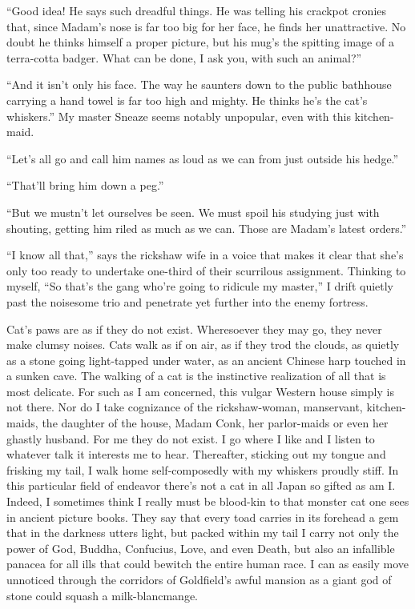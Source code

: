 \documentclass[12pt, openright]{book}
\begin{document}
``Good idea! He says such dreadful things. He was telling his crackpot
cronies that, since Madam's nose is far too big for her face, he finds
her unattractive. No doubt he thinks himself a proper picture, but his
mug's the spitting image of a terra-cotta badger. What can be done, I
ask you, with such an animal?''

``And it isn't only his face. The way he saunters down to the public
bathhouse carrying a hand towel is far too high and mighty. He thinks
he's the cat's whiskers.'' My master Sneaze seems notably unpopular,
even with this kitchen-maid.

``Let's all go and call him names as loud as we can from just outside
his hedge.''

``That'll bring him down a peg.''

``But we mustn't let ourselves be seen. We must spoil his studying just
with shouting, getting him riled as much as we can. Those are Madam's
latest orders.''

``I know all that,'' says the rickshaw wife in a voice that makes it
clear that she's only too ready to undertake one-third of their
scurrilous assignment. Thinking to myself, ``So that's the gang who're
going to ridicule my master,'' I drift quietly past the noisesome trio
and penetrate yet further into the enemy fortress.

Cat's paws are as if they do not exist. Wheresoever they may go, they
never make clumsy noises. Cats walk as if on air, as if they trod the
clouds, as quietly as a stone going light-tapped under water, as an
ancient Chinese harp touched in a sunken cave. The walking of a cat is
the instinctive realization of all that is most delicate. For such as I
am concerned, this vulgar Western house simply is not there. Nor do I
take cognizance of the rickshaw-woman, manservant, kitchen-maids, the
daughter of the house, Madam Conk, her parlor-maids or even her ghastly
husband. For me they do not exist. I go where I like and I listen to
whatever talk it interests me to hear. Thereafter, sticking out my
tongue and frisking my tail, I walk home self-composedly with my
whiskers proudly stiff. In this particular field of endeavor there's not
a cat in all Japan so gifted as am I. Indeed, I sometimes think I really
must be blood-kin to that monster cat one sees in ancient picture books.
They say that every toad carries in its forehead a gem that in the
darkness utters light, but packed within my tail I carry not only the
power of God, Buddha, Confucius, Love, and even Death, but also an
infallible panacea for all ills that could bewitch the entire human
race. I can as easily move unnoticed through the corridors of
Goldfield's awful mansion as a giant god of stone could squash a
milk-blancmange.
\end{document}
